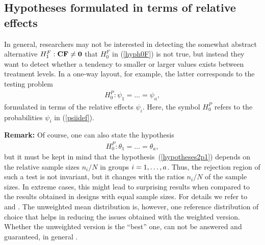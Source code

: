 \subsection{Hypotheses formulated in terms of relative effects} \label{nullh0P}

In general, researchers may not be interested in detecting the somewhat 
abstract alternative $H_1^F: \mathbf{C} \mathbf{F} \neq \mathbf{0}$ that $H_0^F$ in 
(\ref{hyph0F}) is not true, but instead they want to detect whether a tendency 
to smaller or larger values exists between treatment levels. In a one-way 
layout, for example, the latter corresponds to the testing problem 
\begin{eqnarray} 
H_0^P: \psi_1 = \ldots = \psi_a,  \label{hypotheses1p1}
\end{eqnarray}
formulated in terms of the relative effects $\psi_i$. Here, the symbol $H_0^P$ 
refers to the probabilities $\psi_i$ in (\ref{psiidef}). 

\textbf{Remark:} 
Of course, one can also state the hypothesis 
\begin{eqnarray} 
H_0^P: \theta_1 = \ldots = \theta_a, \label{hypotheses2p1}
\end{eqnarray}
but it must be kept in mind that the hypothesis~(\ref{hypotheses2p1}) depends 
on the relative sample sizes $n_i/N$ in groups $i=1, \ldots, a$. Thus, the rejection 
region of such a test is not invariant, but it changes with the ratios $n_i/N$ of 
the sample sizes. In extreme cases, this might lead to surprising results when 
compared to the results obtained in designs with equal sample sizes. For 
details we refer to \cite{brunner2020ranks} and \cite{brunner2019rank}. The unweighted mean distribution is, however, one reference distribution of choice that helps in reducing the issues obtained with the weighted version. Whether the unweighted version is the ``best'' one, can not be answered and guaranteed, in general  \citep{zimmermann2022pseudo}.



